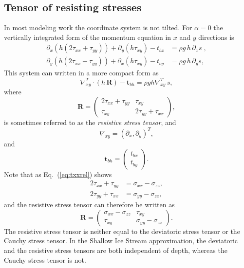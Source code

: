 \documentclass[10pt,a4paper]{book}
\newcommand{\p}{\partial}
\newcommand{\txx}{\tau_{xx}}
\newcommand{\tyy}{\tau_{yy}}
\newcommand{\txy}{\tau_{xy}}
\newcommand{\sxx}{\sigma_{xx}}
\newcommand{\syy}{\sigma_{yy}}
\newcommand{\szz}{\sigma_{zz}}
\begin{document}
\subsection{Tensor of resisting stresses}
In most modeling work the coordinate system is not tilted. For
$\alpha=0$ the vertically integrated form of the momentum equation in
$x$ and $y$ directions is
\begin{align}
\p_x (h (2\txx+\tyy)) + \p_y(h\txy)-t_{bx} &= \rho g \,h \, \p_x s   \;  ,\\
\p_y (h (2\txx+\tyy)) + \p_x(h\txy)-t_{by} &= \rho g \,h \, \p_y s    ,
\end{align}
This system can written in a more compact form as
\begin{equation}
\nabla_{xy}^T \cdot (h \, \bm{R}) - \bm{t}_{bh} = \rho g h \nabla_{xy}^T \, s  
,
\label{eq:FEao}
\end{equation}
where
\begin{equation}
\bm{R}=\begin{pmatrix} 2 \txx+\tyy & \txy \\ \txy & 2 \tyy + \txx \end{pmatrix},
\label{eq:defSigmah}
\end{equation}
is sometimes referred to as the {\em resistive stress tensor}, and
\[
\nabla_{xy} = (\p_x , \p_y)^T ,
\]
and
\[
\bm{t}_{bh}= \left ( \begin{array}{c} t_{bx} \\ t_{by} \end{array} \right ).
\]
Note that as Eq.~(\ref{eq:txxrel}) shows
\begin{align}
2 \txx + \tyy &=  \sxx - \szz ,\\
2 \tyy + \txx &=  \syy - \szz ,
\end{align}
and the resistive stress tensor can therefore be written as 
\begin{equation}
\bm{R}=\begin{pmatrix} \sxx-\szz & \txy \\ \txy & \syy - \szz \end{pmatrix}.
\label{eq:defSigmah2}
\end{equation}
The resistive stress tensor is neither equal to the deviatoric stress
tensor or the Cauchy stress tensor. In the Shallow Ice Stream
approximation, the deviatoric and the resistive stress tensors are both
independent of depth, whereas the Cauchy stress tensor is not.
\end{document}

